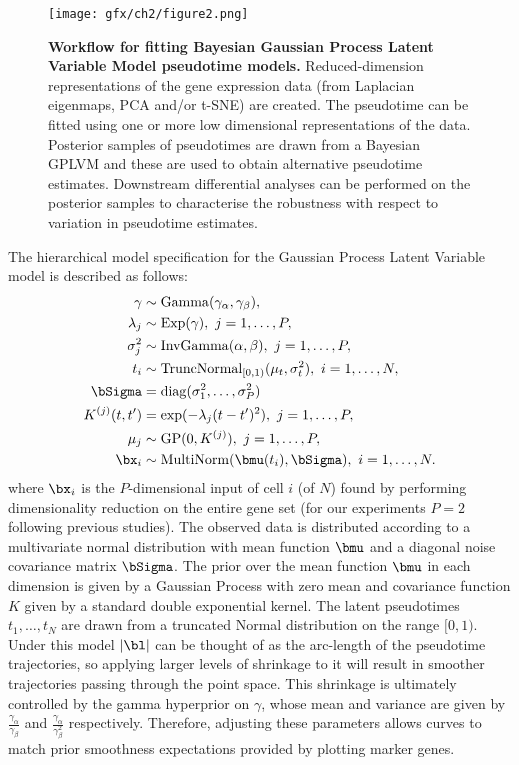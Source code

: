 \begin{figure}[h]
\centering
  \texttt{[image: gfx/ch2/figure2.png]}
  \caption{{\bf Workflow for fitting Bayesian Gaussian Process Latent Variable Model pseudotime models.} Reduced-dimension representations of the gene expression data (from Laplacian eigenmaps, PCA and/or t-SNE) are created. The pseudotime can be fitted using one or more low dimensional representations of the data. Posterior samples of pseudotimes are drawn from a Bayesian GPLVM and these are used to obtain alternative pseudotime estimates. Downstream differential analyses can be performed on the posterior samples to characterise the robustness with respect to variation in pseudotime estimates.} \label{fig:workflow}
\end{figure}

The hierarchical model specification for the Gaussian Process Latent Variable model is described as follows:
\begin{equation} \label{eq:model}
\begin{aligned}
	\gamma & \sim \mathrm{Gamma}(\gamma_\alpha, \gamma_\beta), \\
	\lambda_j & \sim  \mathrm{Exp(\gamma)}, ~j=1,\dots, P, \\
	 \sigma_j^2 & \sim   \mathrm{InvGamma}(\alpha, \beta), ~j=1,\dots, P, \\
	t_i & \sim
			\mathrm{TruncNormal}_{[0, 1)}(\mu_t, \sigma_t^2), ~i=1,\dots,N,\\
	\bSigma & =  \mathrm{diag}(\sigma_1^2, \dots, \sigma_P^2) \\
	K^{(j)}(t, t') & = \exp( -\lambda_j (t-t')^2 ), ~j=1,\dots, P, \\
	\mu_j &\sim  \mathrm{GP}(0, K^{(j)}), ~ j=1,\dots,P,  \\
	\bx_{i} & \sim  \mathrm{MultiNorm}( \bmu(t_i), \bSigma ), ~i=1,\dots,N.
\end{aligned}
\end{equation}
where $\bx_{i}$ is the $P$-dimensional input of cell $i$ (of $N$) found by performing dimensionality reduction on the entire gene set (for our experiments $P=2$ following previous studies). The observed data is distributed according to a multivariate normal distribution with mean function $\bmu$ and a diagonal noise covariance matrix $\bSigma$. The prior over the mean function $\bmu$ in each dimension is given by a Gaussian Process with zero mean and covariance function $K$ given by a standard double exponential kernel. The latent pseudotimes $t_1, \dots, t_N$ are drawn from a truncated Normal distribution on the range $[0, 1)$. Under this model $|\bl|$ can be thought of as the arc-length of the pseudotime trajectories, so applying larger levels of shrinkage to it will result in smoother trajectories passing through the point space. This shrinkage is ultimately controlled by the gamma hyperprior on $\gamma$, whose mean and variance are given by $\frac{\gamma_\alpha}{\gamma_\beta}$ and $\frac{\gamma_\alpha}{\gamma^2_\beta}$ respectively. Therefore, adjusting these parameters allows curves to match prior smoothness expectations provided by plotting marker genes.

